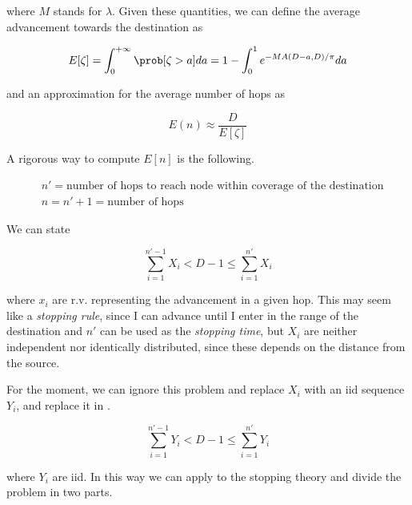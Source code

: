 	where $M$ stands for $\lambda$. Given these quantities, we can define the average advancement towards the destination as

	\begin{equation}
		E[\zeta] = \int_0^{+\infty} \prob[\zeta > a]da = 1-\int_0^1 e^{-MA(D-a,D)/\pi}da
	\end{equation}

	and an approximation for the average number of hops as

	\begin{equation}
		E(n) \approx \frac{D}{E[\zeta]}
	\end{equation}

A rigorous way to compute $E[n]$ is the following.

\begin{equation}\label{hopsdefinition}
	\begin{split}
		&n' = \text{number of hops to reach node within coverage of the destination}\\
		&n = n' + 1 = \text{number of hops}
	\end{split}
\end{equation}

We can state

\begin{equation}\label{firstBound}
	\sum_{i=1}^{n'-1} X_i < D-1 \le \sum_{i=1}^{n'} X_i
\end{equation}

where $x_i$ are r.v. representing the advancement in a given hop.
This may seem like a \textit{stopping rule}, since I can advance until I enter in the range of the destination and $n'$ can be used as the \textit{stopping time}, but $X_i$ are neither independent nor identically distributed, since these depends on the distance from the source.

For the moment, we can ignore this problem and replace $X_i$ with an iid sequence $Y_i$, and replace it in .

\begin{equation}\label{stoppingRule}
	\sum_{i=1}^{n'-1} Y_i < D-1 \le \sum_{i=1}^{n'} Y_i
\end{equation}

where $Y_i$ are iid.
In this way we can apply to  the stopping theory and divide the problem in two parts.

